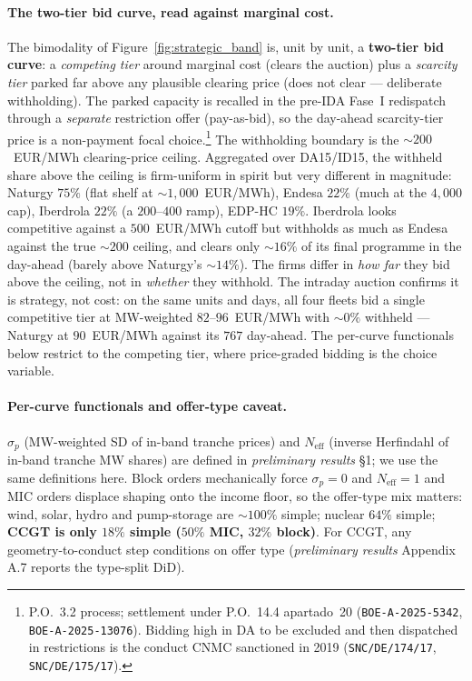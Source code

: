 \documentclass[11pt,a4paper]{article}
\begin{document}
\paragraph{The two-tier bid curve, read against marginal cost.} The bimodality of Figure~\ref{fig:strategic_band} is, unit by unit, a \textbf{two-tier bid curve}: a \emph{competing tier} around marginal cost (clears the auction) plus a \emph{scarcity tier} parked far above any plausible clearing price (does not clear --- deliberate withholding). The parked capacity is recalled in the pre-IDA Fase~I redispatch through a \emph{separate} restriction offer (pay-as-bid), so the day-ahead scarcity-tier price is a non-payment focal choice.\footnote{P.O.~3.2 process; settlement under P.O.~14.4 apartado~20 (\texttt{BOE-A-2025-5342}, \texttt{BOE-A-2025-13076}). Bidding high in DA to be excluded and then dispatched in restrictions is the conduct CNMC sanctioned in 2019 (\texttt{SNC/DE/174/17}, \texttt{SNC/DE/175/17}).} The withholding boundary is the $\sim\!200$~EUR/MWh clearing-price ceiling. Aggregated over DA15/ID15, the withheld share above the ceiling is firm-uniform in spirit but very different in magnitude: Naturgy $75\%$ (flat shelf at $\sim\!1{,}000$~EUR/MWh), Endesa $22\%$ (much at the $4{,}000$ cap), Iberdrola $22\%$ (a $200$--$400$ ramp), EDP-HC $19\%$. Iberdrola looks competitive against a $500$~EUR/MWh cutoff but withholds as much as Endesa against the true $\sim\!200$ ceiling, and clears only $\sim\!16\%$ of its final programme in the day-ahead (barely above Naturgy's $\sim\!14\%$). The firms differ in \emph{how far} they bid above the ceiling, not in \emph{whether} they withhold. The intraday auction confirms it is strategy, not cost: on the same units and days, all four fleets bid a single competitive tier at MW-weighted $82$--$96$~EUR/MWh with $\sim\!0\%$ withheld --- Naturgy at $90$~EUR/MWh against its $767$ day-ahead. The per-curve functionals below restrict to the competing tier, where price-graded bidding is the choice variable.

\paragraph{Per-curve functionals and offer-type caveat.} $\sigma_p$ (MW-weighted SD of in-band tranche prices) and $N_{\text{eff}}$ (inverse Herfindahl of in-band tranche MW shares) are defined in \emph{preliminary results} \S 1; we use the same definitions here. Block orders mechanically force $\sigma_p\!=\!0$ and $N_{\text{eff}}\!=\!1$ and MIC orders displace shaping onto the income floor, so the offer-type mix matters: wind, solar, hydro and pump-storage are $\sim\!100\%$ simple; nuclear $64\%$ simple; \textbf{CCGT is only $18\%$ simple ($50\%$ MIC, $32\%$ block)}. For CCGT, any geometry-to-conduct step conditions on offer type (\emph{preliminary results} Appendix A.7 reports the type-split DiD).
\end{document}
